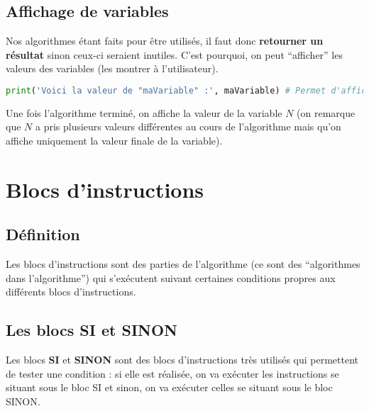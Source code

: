 	\subsection{Affichage de variables}

	Nos algorithmes étant faits pour être utilisés, il faut donc \textbf{retourner un résultat} sinon ceux-ci seraient inutiles. C'est pourquoi, on peut ``afficher'' les valeurs des variables (les montrer à l'utilisateur).

	\begin{formula}[En python]
		\entretitreetliste
\begin{lstlisting}[language=python]
print('Voici la valeur de "maVariable" :', maVariable) # Permet d'afficher la valeur de "maVariable".
\end{lstlisting}
	\end{formula}

	\begin{tip}
		Une fois l'algorithme terminé, on affiche la valeur de la variable $N$ (on remarque que $N$ a pris plusieurs valeurs différentes au cours de l'algorithme mais qu'on affiche uniquement la valeur finale de la variable).
	\end{tip}

	\section{Blocs d'instructions}

	\subsection{Définition}

	Les blocs d'instructions sont des parties de l'algorithme (ce sont des ``algorithmes dans l'algorithme'') qui s'exécutent suivant certaines conditions propres aux différents blocs d'instructions.

	\subsection{Les blocs SI et SINON}

	Les blocs \textbf{SI} et \textbf{SINON} sont des blocs d'instructions très utilisés qui permettent de tester une condition : si elle est réalisée, on va exécuter les instructions se situant sous le bloc SI et sinon, on va exécuter celles se situant sous le bloc SINON.

